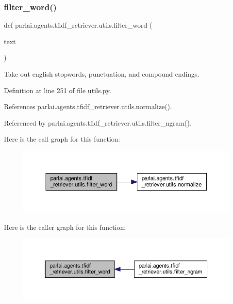 \subsubsection{\texorpdfstring{filter\+\_\+word()}{filter\_word()}}
{\footnotesize\ttfamily def parlai.\+agents.\+tfidf\+\_\+retriever.\+utils.\+filter\+\_\+word (\begin{DoxyParamCaption}\item[{}]{text }\end{DoxyParamCaption})}

\begin{DoxyVerb}Take out english stopwords, punctuation, and compound endings.\end{DoxyVerb}
 

Definition at line 251 of file utils.\+py.



References parlai.\+agents.\+tfidf\+\_\+retriever.\+utils.\+normalize().



Referenced by parlai.\+agents.\+tfidf\+\_\+retriever.\+utils.\+filter\+\_\+ngram().

Here is the call graph for this function\+:
\nopagebreak
\begin{figure}[H]
\begin{center}
\leavevmode
\includegraphics[width=350pt]{namespaceparlai_1_1agents_1_1tfidf__retriever_1_1utils_a57608b2b9a61223e39e3cb51f5c9f812_cgraph}
\end{center}
\end{figure}
Here is the caller graph for this function\+:
\nopagebreak
\begin{figure}[H]
\begin{center}
\leavevmode
\includegraphics[width=350pt]{namespaceparlai_1_1agents_1_1tfidf__retriever_1_1utils_a57608b2b9a61223e39e3cb51f5c9f812_icgraph}
\end{center}
\end{figure}
\mbox{\label{namespaceparlai_1_1agents_1_1tfidf__retriever_1_1utils_a6df58709964913e04733db89d6e187db}} 
